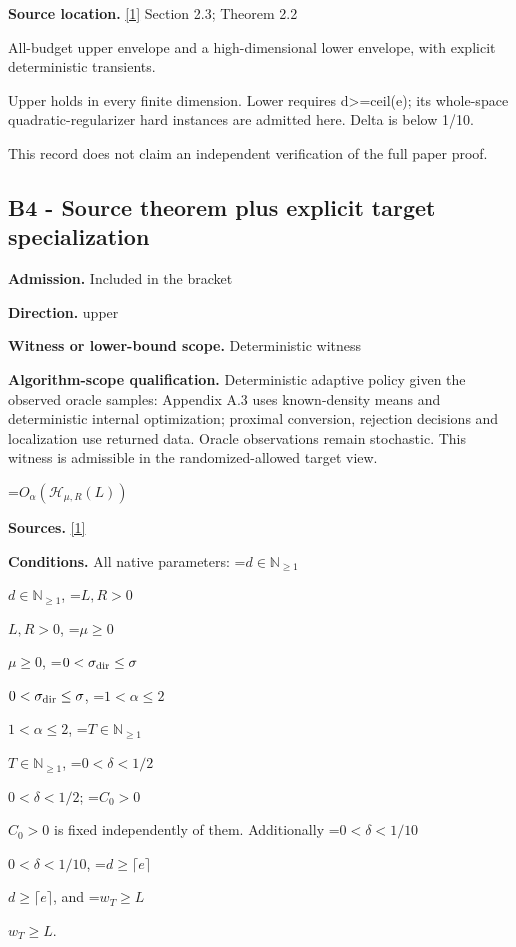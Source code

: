 \documentclass[10pt,a4paper]{article}
\newcommand{\AtlasMath}[1]{\par\begingroup\centering\setbox0=\hbox{$\displaystyle #1$}\ifdim\wd0>1.4\linewidth\typeout{ATLAS WIDE FORMULA: \the\wd0}\fi\ifdim\wd0>\linewidth\resizebox{\linewidth}{!}{\box0}\else\box0\fi\par\endgroup}
\newcommand{\AtlasInlineMath}[1]{\begingroup\setbox0=\hbox{$#1$}\ifdim\wd0>.4\linewidth\endgroup\AtlasMath{#1}\else\endgroup$#1$\fi}
\begin{document}
\textbf{Source location.} \href{https://arxiv.org/html/2610.00260v2}{[1]} Section 2.3; Theorem 2.2



All-budget upper envelope and a high-dimensional lower envelope, with explicit deterministic transients.



Upper holds in every finite dimension. Lower requires d>=ceil(e); its whole-space quadratic-regularizer hard instances are admitted here. Delta is below 1/10.



This record does not claim an independent verification of the full paper proof.



\subsection{B4 - Source theorem plus explicit target specialization}


\textbf{Admission.} Included in the bracket



\textbf{Direction.} upper



\textbf{Witness or lower-bound scope.} Deterministic witness



\textbf{Algorithm-scope qualification.} Deterministic adaptive policy given the observed oracle samples: Appendix A.3 uses known-density means and deterministic internal optimization; proximal conversion, rejection decisions and localization use returned data. Oracle observations remain stochastic. This witness is admissible in the randomized-allowed target view.



\AtlasMath{O_{\alpha}\!\left(\mathcal H_{\mu,R}(L)\right)}


\textbf{Sources.} \href{https://arxiv.org/html/2610.00260v2}{[1]}



\textbf{Conditions.} All native parameters: \AtlasInlineMath{d\in\mathbb N_{\ge1}}, \AtlasInlineMath{L,R>0}, \AtlasInlineMath{\mu\ge0}, \AtlasInlineMath{0<\sigma_{\rm dir}\le\sigma}, \AtlasInlineMath{1<\alpha\le2}, \AtlasInlineMath{T\in\mathbb N_{\ge1}}, \AtlasInlineMath{0<\delta<1/2}; \AtlasInlineMath{C_0>0} is fixed independently of them. Additionally \AtlasInlineMath{0<\delta<1/10}, \AtlasInlineMath{d\ge\lceil e\rceil}, and \AtlasInlineMath{w_T\ge L}.
\end{document}
